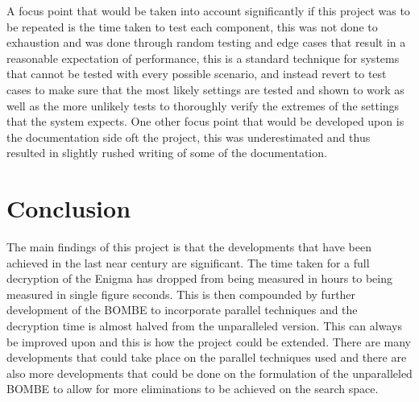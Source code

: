 \documentclass[12pt,a4paper]{article}
\begin{document}
A focus point that would be taken into account significantly if this project was to be repeated is the time taken to test each component, this was not done to exhaustion and was done through random testing and edge cases that result in a reasonable expectation of performance, this is a standard technique for systems that cannot be tested with every possible scenario, and instead revert to test cases to make sure that the most likely settings are tested and shown to work as well as the more unlikely tests to thoroughly verify the extremes of the settings that the system expects. One other focus point that would be developed upon is the documentation side oft the project, this was underestimated and thus resulted in slightly rushed writing of some of the documentation.

\section{Conclusion}

The main findings of this project is that the developments that have been achieved in the last near century are significant. The time taken for a full decryption of the Enigma has dropped from being measured in hours to being measured in single figure seconds. This is then compounded by further development of the BOMBE to incorporate parallel techniques and the decryption time is almost halved from the unparalleled version. This can always be improved upon and this is how the project could be extended. There are many developments that could take place on the parallel techniques used and there are also more developments that could be done on the formulation of the unparalleled BOMBE to allow for more eliminations to be achieved on the search space.



\nocite{*}
\end{document}

